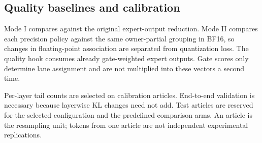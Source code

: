 \subsection{Quality baselines and calibration}
Mode I compares against the original expert-output reduction. Mode II compares each precision policy against the same owner-partial grouping in BF16, so changes in floating-point association are separated from quantization loss. The quality hook consumes already gate-weighted expert outputs. Gate scores only determine lane assignment and are not multiplied into these vectors a second time.

Per-layer tail counts are selected on calibration articles. End-to-end validation is necessary because layerwise KL changes need not add. Test articles are reserved for the selected configuration and the predefined comparison arms. An article is the resampling unit; tokens from one article are not independent experimental replications.
